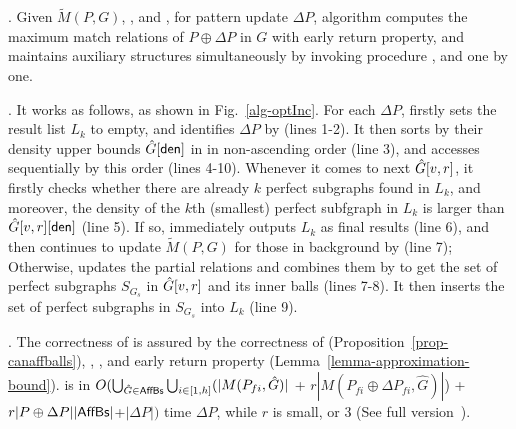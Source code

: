 
.
Given $\tilde{M}(P,G)$, \fb, \bfc and \upl, for pattern update $\Delta P$,
algorithm \incp computes the maximum match relations of $P \oplus \Delta P$ in $G$ with early return property, and maintains auxiliary structures simultaneously by invoking procedure \identifyaffball, \incmatch and \comb one by one.

. It works as follows, as shown in Fig.~\ref{alg-optInc}.
For each $\Delta P$, \incp firstly sets the result list $L_{k}$ to empty,
and identifies \affballsx \wrt $\Delta P$ by \identifyaffball (lines 1-2).
It then sorts \affballsx by their density upper bounds $\hat{G}{}[{\mathsf{den}}]$ in \bs in non-ascending order (line 3),
and accesses \affballsx sequentially by this order (lines 4-10).
Whenever it comes to next \affballx $\hat{G}{[v,r]}$, it firstly checks whether there are already $k$ perfect subgraphs found in $L_{k}$, and moreover,
the density of the $k$th (smallest) perfect subfgraph in $L_{k}$ is larger than $\hat{G}{[v,r]}[{\mathsf{den}}]$ (line 5).
If so, \incp immediately outputs $L_{k}$ as final results (line 6),
and then continues to update $\tilde{M}(P,G)$ for those \affballsx in background by \incmatch (line 7);
Otherwise, \incp updates the partial relations and combines them by \comb to get the set of perfect subgraphs $S_{G_s}$ in $\hat{G}{[v,r]}$ and its inner balls (lines 7-8).
It then inserts the set of perfect subgraphs in $S_{G_s}$ into $L_{k}$ (line 9).

.
The correctness of \incp is assured by the correctness of \identifyaffball (Proposition~\ref{prop-canaffballs}), \incmatch, \comb, and early return property (Lemma~\ref{lemma-approximation-bound}).
\incp is in $O(\bigcup_{\hat{G}\in {\ensuremath {\mathsf{AffBs}}}}\bigcup_{i\in[1,h]}(|M(P_{fi}, \hat{G})|$ + $r|M(P_{fi} \oplus \Delta P_{fi}, \hat{G})|$) + $r|P \oplus \Delta P||{\mathsf{AffBs}}|$+$|\Delta P|)$ time \wrt $\Delta P$, while $r$ is small,  or 3 (See full version~\cite{fullvldb18}).


